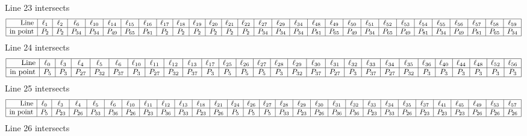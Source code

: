 \documentclass{article}
\begin{document}
{$$$$
Line 23 intersects 
$$
\begin{array}{|r*{28}{|c}|}
\hline
\mbox{Line}  & \ell_{1} & \ell_{2} & \ell_{6} & \ell_{10} & \ell_{14} & \ell_{15} & \ell_{16} & \ell_{17} & \ell_{18} & \ell_{19} & \ell_{20} & \ell_{21} & \ell_{22} & \ell_{27} & \ell_{29} & \ell_{34} & \ell_{48} & \ell_{49} & \ell_{50} & \ell_{51} & \ell_{52} & \ell_{53} & \ell_{54} & \ell_{55} & \ell_{56} & \ell_{57} & \ell_{58} & \ell_{59}\\
\hline
\mbox{in point}  & P_{2} & P_{2} & P_{34} & P_{34} & P_{49} & P_{65} & P_{81} & P_{2} & P_{2} & P_{2} & P_{2} & P_{2} & P_{2} & P_{34} & P_{34} & P_{34} & P_{81} & P_{65} & P_{49} & P_{34} & P_{65} & P_{49} & P_{81} & P_{34} & P_{49} & P_{81} & P_{65} & P_{34}\\
\hline
\end{array}
$$
Line 24 intersects 
$$
\begin{array}{|r*{27}{|c}|}
\hline
\mbox{Line}  & \ell_{0} & \ell_{3} & \ell_{4} & \ell_{5} & \ell_{6} & \ell_{10} & \ell_{11} & \ell_{12} & \ell_{13} & \ell_{17} & \ell_{25} & \ell_{26} & \ell_{27} & \ell_{28} & \ell_{29} & \ell_{30} & \ell_{31} & \ell_{32} & \ell_{33} & \ell_{34} & \ell_{35} & \ell_{36} & \ell_{40} & \ell_{44} & \ell_{48} & \ell_{52} & \ell_{56}\\
\hline
\mbox{in point}  & P_{5} & P_{3} & P_{27} & P_{32} & P_{37} & P_{3} & P_{27} & P_{32} & P_{37} & P_{3} & P_{5} & P_{5} & P_{5} & P_{3} & P_{32} & P_{37} & P_{27} & P_{3} & P_{37} & P_{27} & P_{32} & P_{3} & P_{3} & P_{3} & P_{3} & P_{3} & P_{3}\\
\hline
\end{array}
$$
Line 25 intersects 
$$
\begin{array}{|r*{28}{|c}|}
\hline
\mbox{Line}  & \ell_{0} & \ell_{3} & \ell_{4} & \ell_{5} & \ell_{6} & \ell_{10} & \ell_{11} & \ell_{12} & \ell_{13} & \ell_{18} & \ell_{21} & \ell_{24} & \ell_{26} & \ell_{27} & \ell_{28} & \ell_{29} & \ell_{30} & \ell_{31} & \ell_{32} & \ell_{33} & \ell_{34} & \ell_{35} & \ell_{37} & \ell_{41} & \ell_{45} & \ell_{49} & \ell_{53} & \ell_{57}\\
\hline
\mbox{in point}  & P_{5} & P_{23} & P_{26} & P_{33} & P_{36} & P_{26} & P_{23} & P_{36} & P_{33} & P_{23} & P_{26} & P_{5} & P_{5} & P_{5} & P_{33} & P_{23} & P_{26} & P_{36} & P_{36} & P_{23} & P_{33} & P_{26} & P_{23} & P_{23} & P_{23} & P_{26} & P_{26} & P_{26}\\
\hline
\end{array}
$$
Line 26 intersects 
$$
\begin{array}{|r*{28}{|c}|}

\end{array}$$}
\end{document}
